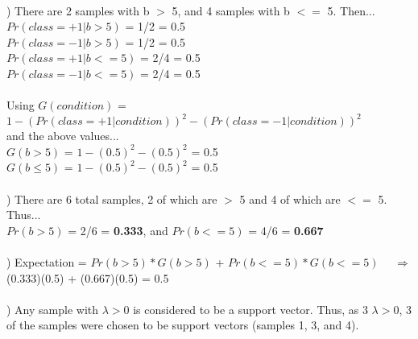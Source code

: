 \documentclass[12pt]{article}
\begin{document}
\noindent \hrulefill \\\pagebreak



) There are 2 samples with b $>$ 5, and 4 samples with b $<=$ 5. Then...\\[.4em]
\indent $Pr(class = +1 | b>5)$ = 1/2 = 0.5\\
\indent $Pr(class = -1 | b>5)$ = 1/2 = 0.5\\
\indent $Pr(class = +1 | b<=5)$ = 2/4 = 0.5\\
\indent $Pr(class = -1 | b<=5)$ = 2/4 = 0.5\\\\
\indent Using $G(condition)$ = $1 - (Pr(class = +1 | condition))^2 - (Pr(class = -1 | condition))^2$ \\
\indent \indent and the above values...\\[.4em]
\indent $G(b>5)$ = $1 - (0.5)^2 - (0.5)^2$ = 0.5\\
\indent $G(b\le5)$ = $1 - (0.5)^2 - (0.5)^2$ = 0.5\\[-.4em]



\noindent \hrulefill \\



) There are 6 total samples, 2 of which are $>$ 5  and 4 of which are $<=$ 5. Thus...\\
\indent $Pr(b > 5)$ = 2/6 = \textbf{0.333}, and $Pr(b <= 5)$ = 4/6 = \textbf{0.667}\\[-.4em]



\noindent \hrulefill \\



) Expectation = $Pr(b > 5)*G(b > 5)$  +  $Pr(b <= 5)*G(b <= 5)$ \ \ $\Rightarrow$ \\[.4em]
\indent \indent (0.333)(0.5) + (0.667)(0.5) = 0.5\\[-.4em]



\noindent \hrulefill \\



) Any sample with $\lambda > 0$ is considered to be a support vector. Thus, as 3 $\lambda > 0$, 3 of the samples were chosen to be support vectors (samples 1, 3, and 4).\\[-.4em]
\end{document}
